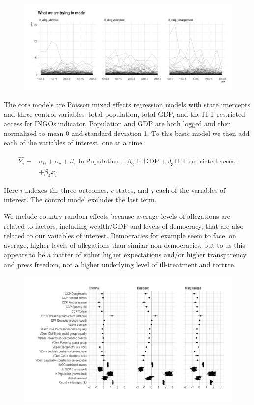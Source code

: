 \documentclass[12pt]{article}
\begin{document}
\begin{figure}
\includegraphics[width=.9\textwidth]{../output/figures/outcome-time-series.png}
\end{figure}

The core models are Poisson mixed effects regression models with state intercepts and three control variables: total population, total GDP, and the ITT restricted access for INGOs indicator. Population and GDP are both logged and then normalized to mean 0 and standard deviation 1. To this basic model we then add each of the variables of interest, one at a time. 

$$
\begin{aligned}
\hat{Y_i} =& \alpha_0 + \alpha_c + \beta_1 \ln \textrm{Population} + \beta_2 \ln \textrm{GDP} + \beta_3 \textrm{ITT\_restricted\_access} \\
& + \beta_4 x_j 
\end{aligned}
$$

Here $i$ indexes the three outcomes, $c$ states, and $j$ each of the variables of interest. The control model excludes the last term. 

We include country random effects because average levels of allegations are related to factors, including wealth/GDP and levels of democracy, that are also related to our variables of interest. Democracies for example seem to face, on average, higher levels of allegations than similar non-democracies, but to us this appears to be a matter of either higher expectations and/or higher transparency and press freedom, not a higher underlying level of ill-treatment and torture. 


\begin{figure}
\includegraphics[width=.9\textwidth]{../output/figures/model-coefs.png}
\end{figure}
\end{document}
